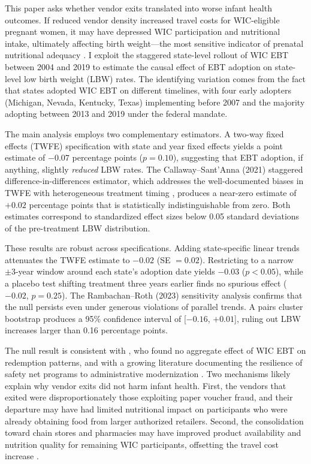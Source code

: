 \documentclass[12pt]{article}
\begin{document}
This paper asks whether vendor exits translated into worse infant health outcomes. If reduced vendor density increased travel costs for WIC-eligible pregnant women, it may have depressed WIC participation and nutritional intake, ultimately affecting birth weight---the most sensitive indicator of prenatal nutritional adequacy \citep{kramer1987}. I exploit the staggered state-level rollout of WIC EBT between 2004 and 2019 to estimate the causal effect of EBT adoption on state-level low birth weight (LBW) rates. The identifying variation comes from the fact that states adopted WIC EBT on different timelines, with four early adopters (Michigan, Nevada, Kentucky, Texas) implementing before 2007 and the majority adopting between 2013 and 2019 under the federal mandate.

The main analysis employs two complementary estimators. A two-way fixed effects (TWFE) specification with state and year fixed effects yields a point estimate of $-0.07$ percentage points ($p=0.10$), suggesting that EBT adoption, if anything, slightly \textit{reduced} LBW rates. The Callaway--Sant'Anna (2021) staggered difference-in-differences estimator, which addresses the well-documented biases in TWFE with heterogeneous treatment timing \citep{callaway2021, goodman2021, sun2021}, produces a near-zero estimate of $+0.02$ percentage points that is statistically indistinguishable from zero. Both estimates correspond to standardized effect sizes below 0.05 standard deviations of the pre-treatment LBW distribution.

These results are robust across specifications. Adding state-specific linear trends attenuates the TWFE estimate to $-0.02$ (SE $=0.02$). Restricting to a narrow $\pm 3$-year window around each state's adoption date yields $-0.03$ ($p<0.05$), while a placebo test shifting treatment three years earlier finds no spurious effect ($-0.02$, $p=0.25$). The Rambachan--Roth (2023) sensitivity analysis confirms that the null persists even under generous violations of parallel trends. A pairs cluster bootstrap produces a 95\% confidence interval of [$-0.16$, $+0.01$], ruling out LBW increases larger than 0.16 percentage points.

The null result is consistent with \citet{ambrozek2025}, who found no aggregate effect of WIC EBT on redemption patterns, and with a growing literature documenting the resilience of safety net programs to administrative modernization \citep{currie2003, hoynes2011}. Two mechanisms likely explain why vendor exits did not harm infant health. First, the vendors that exited were disproportionately those exploiting paper voucher fraud, and their departure may have had limited nutritional impact on participants who were already obtaining food from larger authorized retailers. Second, the consolidation toward chain stores and pharmacies may have improved product availability and nutrition quality for remaining WIC participants, offsetting the travel cost increase \citep{andreyeva2012, ohri2017}.
\end{document}
